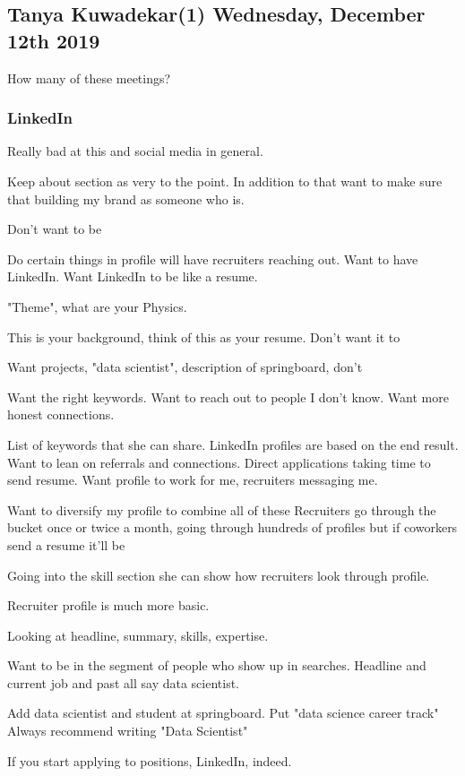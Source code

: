 \subsection{Tanya Kuwadekar(1) Wednesday, December 12th 2019}


How many of these meetings?

\subsubsection{LinkedIn}
Really bad at this and social media in general.

Keep about section as very to the point.
In addition to that want to make sure
that building my brand as someone who is.

Don't want to be

Do certain things in profile will have recruiters
reaching out. Want to have LinkedIn. Want
LinkedIn to be like a resume. 

"Theme", what are your Physics. 

This is your background, think of this as your resume.
Don't  want it to

Want projects, "data scientist", description of springboard, don't 

Want the right keywords. Want to reach out to people
I don't know. Want more honest connections. 

List of keywords that she can share. LinkedIn profiles
are based on the end result. Want to lean on referrals
and connections. Direct applications taking time
to send resume. Want profile to work for me, recruiters messaging me.

Want to diversify my profile to combine all of these 
Recruiters go through the bucket once or twice a month,
going through hundreds of profiles but if coworkers send
a resume it'll be 

Going into the skill section she can show how recruiters look through profile. 

Recruiter profile is much more basic. 

Looking at headline, summary, skills, expertise. 

Want to be in the segment of people who show up in searches. Headline and current job and past all say data
scientist. 

Add data scientist and student at springboard. 
Put "data science career track"
Always recommend writing "Data Scientist"

If you start applying to positions, LinkedIn, indeed.

